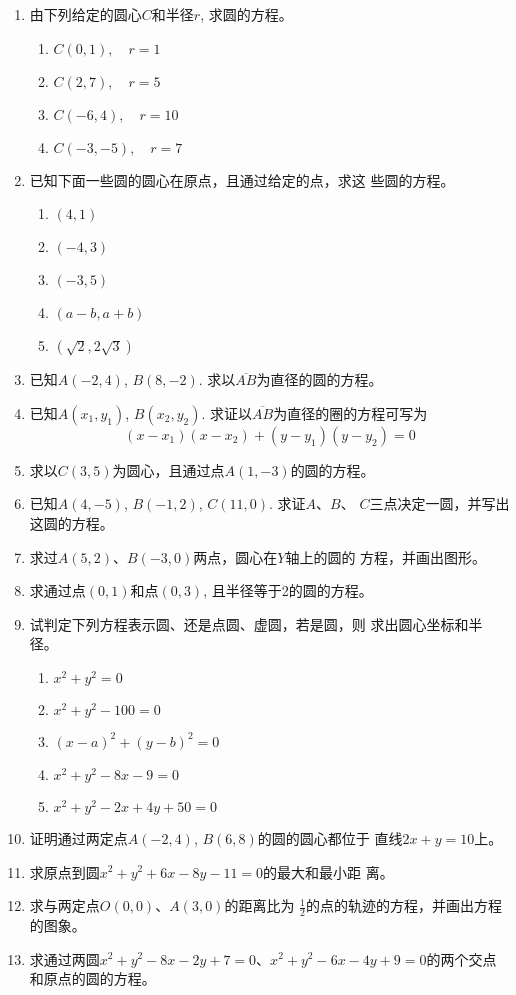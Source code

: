 \begin{ex}
\begin{enumerate}
    \item 由下列给定的圆心$C$和半径$r$, 求圆的方程。
\begin{multicols}{2}
\begin{enumerate}
    \item $C(0,1),\quad r=1$
    \item $C(2,7),\quad r=5$
    \item $C(-6,4),\quad r=10$
    \item $C(-3,-5),\quad r=7$
\end{enumerate}
\end{multicols}
    \item 已知下面一些圆的圆心在原点，且通过给定的点，求这
    些圆的方程。
\begin{multicols}{3}
\begin{enumerate}
    \item $(4,1)$
    \item $(-4,3)$
    \item $(-3,5)$
    \item $(a-b,a+b)$
    \item $(\sqrt{2},2\sqrt{3})$
\end{enumerate}
\end{multicols}

\item 已知$A(-2,4)$, $B(8,-2)$. 求以$\overline{AB}$为直径的圆的方程。
\item 已知$A(x_1,y_1)$, $B(x_2,y_2)$. 求证以$\overline{AB}$为直径的圈的方程可写为
\[(x-x_1)(x-x_2)+(y-y_1)(y-y_2)=0\]
\item 求以$C(3,5)$为圆心，且通过点$A(1,-3)$的圆的方程。
\item 已知$A(4,-5)$, $B(-1,2)$, $C(11,0)$. 求证$A$、$B$、
$C$三点决定一圆，并写出这圆的方程。
\item 求过$A(5,2)$、$B(-3,0)$两点，圆心在$Y$轴上的圆的
方程，并画出图形。
\item 求通过点$(0,1)$和点$(0,3)$, 且半径等于2的圆的方程。
\item 试判定下列方程表示圆、还是点圆、虚圆，若是圆，则
求出圆心坐标和半径。
\begin{enumerate}
\item $x^2+y^2=0$
\item $x^2+y^2-100=0$
\item $(x-a)^2+(y-b)^2=0$
\item $x^2+y^2-8x-9=0$
\item $x^2+y^2-2x+4y+50=0$
\end{enumerate}

\item 证明通过两定点$A(-2,4)$, $B(6,8)$的圆的圆心都位于
直线$2x+y=10$上。
\item 求原点到圆$x^2+y^2+6x-8y-11=0$的最大和最小距
离。
\item 求与两定点$O(0,0)$、$A(3,0)$的距离比为
$\frac{1}{2}$的点的轨迹的方程，并画出方程的图象。
\item 求通过两圆$x^2+y^2-8x-2y+7=0$、$x^2+y^2-6x-
4y+9=0$的两个交点和原点的圆的方程。
\end{enumerate}
\end{ex}

